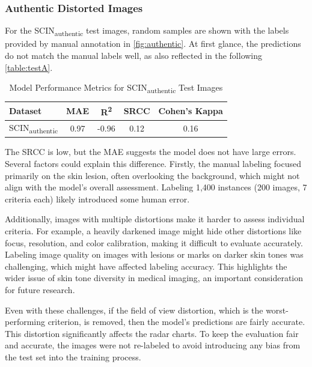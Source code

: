 \subsubsection{Authentic Distorted Images}
For the SCIN\textsubscript{authentic} test images, random samples are shown with the labels provided by manual annotation in \autoref{fig:authentic}. At first glance, the predictions do not match the manual labels well, as also reflected in the following \autoref{table:testA}. \par
\begin{table}[ht]
    \centering
    \begin{tabular}{|l|c|c|c|c|}
        \hline
        \textbf{Dataset} & \textbf{MAE} & \textbf{R\textsuperscript{2}} & \textbf{SRCC} & \textbf{Cohen's Kappa} \\
        \hline
        SCIN\textsubscript{authentic} & 0.97 & -0.96 & 0.12 & 0.16 \\
        \hline
    \end{tabular}
    \caption{Model Performance Metrics for SCIN\textsubscript{authentic} Test Images}
    \label{table:testA}
\end{table}
\noindent
The SRCC is low, but the MAE suggests the model does not have large errors. Several factors could explain this difference. Firstly, the manual labeling focused primarily on the skin lesion, often overlooking the background, which might not align with the model’s overall assessment. Labeling 1,400 instances (200 images, 7 criteria each) likely introduced some human error. \par
\vspace{\baselineskip}
\noindent
Additionally, images with multiple distortions make it harder to assess individual criteria. For example, a heavily darkened image might hide other distortions like focus, resolution, and color calibration, making it difficult to evaluate accurately. Labeling image quality on images with lesions or marks on darker skin tones was challenging, which might have affected labeling accuracy. This highlights the wider issue of skin tone diversity in medical imaging, an important consideration for future research. \par
\vspace{\baselineskip}
\noindent
Even with these challenges, if the field of view distortion, which is the worst-performing criterion, is removed, then the model’s predictions are fairly accurate. This distortion significantly affects the radar charts. To keep the evaluation fair and accurate, the images were not re-labeled to avoid introducing any bias from the test set into the training process. \par

